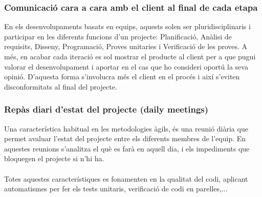 \documentclass[12pt,a4paper,openright,oneside]{article}
\numberwithin{equation}{section}
\theoremstyle{definition}
\begin{document}
\subsubsection*{Comunicació cara a cara amb el client al final de cada etapa}
En els desenvolupaments basats en equips, aquests solen ser pluridisciplinaris i participar en les diferents funcions d'un projecte: Planificació, Anàlisi de requisits, Disseny, Programació, Proves unitaries i Verificació de les proves. A més, en acabar cada iteració es sol mostrar el producte al client per a que pugui valorar el desenvolupament i aportar en el cas que ho consideri oportú la seva opinió. D'aquesta forma s'involucra més el client en el procés i així s'eviten disconformitats al final del projecte.\\
\subsubsection*{Repàs diari d'estat del projecte (daily meetings)}
Una característica habitual en les metodologies àgils, és una reunió diària que permet avaluar l'estat del projecte entre els diferents membres de l'equip. En aquestes reunions s'analitza el què es farà en aquell dia, i els impediments que bloquegen el projecte si n'hi ha.\\\\
Totes aquestes característiques es fonamenten en la qualitat del codi, aplicant automatismes per fer els tests unitaris, verificació de codi en parelles,...\cite{agile}\\\\
\end{document}
